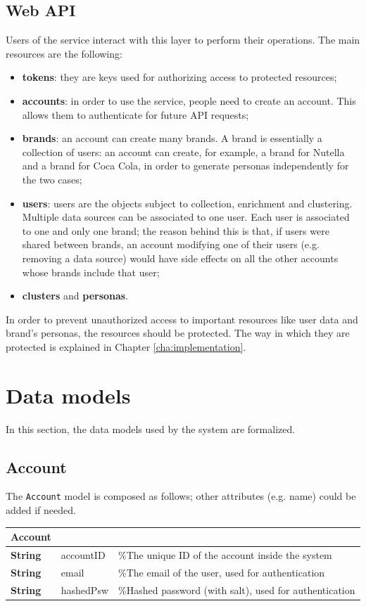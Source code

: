 \subsection{Web API}
Users of the service interact with this layer to perform their operations. The main resources are the following:
\begin{itemize}
    \item \textbf{tokens}: they are keys used for authorizing access to protected resources;
    \item \textbf{accounts}: in order to use the service, people need to create an account. This allows them to authenticate for future API requests;
    \item \textbf{brands}: an account can create many brands. A brand is essentially a collection of users: an account can create, for example, a brand for Nutella and a brand for Coca Cola, in order to generate personas independently for the two cases;
    \item \textbf{users}: users are the objects subject to collection, enrichment and clustering. Multiple data sources can be associated to one user. Each user is associated to one and only one brand; the reason behind this is that, if users were shared between brands, an account modifying one of their users (e.g. removing a data source) would have side effects on all the other accounts whose brands include that user;
    \item \textbf{clusters} and \textbf{personas}.
\end{itemize}
In order to prevent unauthorized access to important resources like user data and brand's personas, the resources should be protected. The way in which they are protected is explained in Chapter \ref{cha:implementation}.

\section{Data models}
In this section, the data models used by the system are formalized.

\subsection{Account}
The \texttt{Account} model is composed as follows; other attributes (e.g. name) could be added if needed.
\begin{center}
\begin{tabular}{lll}
\hline
Account & & \\
\hline
\textbf{String} & accountID & \%The unique ID of the account inside the system \\
\textbf{String} & email & \%The email of the user, used for authentication \\
\textbf{String} & hashedPsw & \%Hashed password (with salt), used for authentication \\
\hline
\end{tabular}
\end{center}

